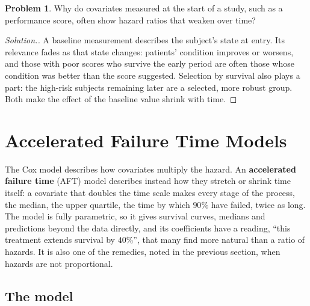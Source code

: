 \documentclass[11pt,a4paper]{article}
\numberwithin{equation}{section}
\theoremstyle{definition}
\newtheorem{problemx}{Problem}[subsection]
\newenvironment{problem}{\begin{problemx}}{\end{problemx}}
\newenvironment{solution}
  {\renewcommand{\qedsymbol}{}\begin{proof}[\textit{Solution}.]}
  {\end{proof}}
\begin{document}
\begin{problem}
Why do covariates measured at the start of a study, such as a performance score, often show hazard ratios that weaken over time?
\end{problem}

\begin{solution}
A baseline measurement describes the subject's state at entry. Its relevance fades as that state changes: patients' condition improves or worsens, and those with poor scores who survive the early period are often those whose condition was better than the score suggested. Selection by survival also plays a part: the high-risk subjects remaining later are a selected, more robust group. Both make the
effect of the baseline value shrink with time.
\end{solution}

\section{Accelerated Failure Time Models}
\label{sec:aft}

The Cox model describes how covariates multiply the hazard. An \textbf{accelerated failure time} (AFT) model describes instead how they stretch or shrink time itself: a covariate that doubles the time scale makes every stage of the process, the median, the upper quartile, the time by which $90\%$ have failed, twice as long. The model is fully parametric, so it gives
survival curves, medians and predictions beyond the data directly, and its coefficients have a reading, ``this treatment extends survival by $40\%$'', that many find more natural than a ratio of hazards. It is also one of the remedies, noted in the previous section, when hazards are not proportional.

\subsection{The model}
\label{ssec:aftmodel}
\end{document}
